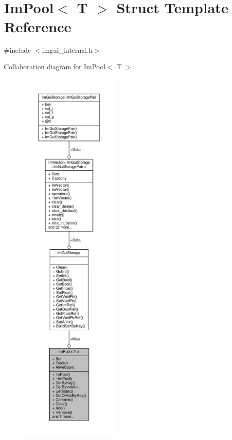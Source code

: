 \hypertarget{structImPool}{}\section{Im\+Pool$<$ T $>$ Struct Template Reference}
\label{structImPool}


{\ttfamily \#include $<$imgui\+\_\+internal.\+h$>$}



Collaboration diagram for Im\+Pool$<$ T $>$\+:
\nopagebreak
\begin{figure}[H]
\begin{center}
\leavevmode
\includegraphics[height=550pt]{structImPool__coll__graph}
\end{center}
\end{figure}
